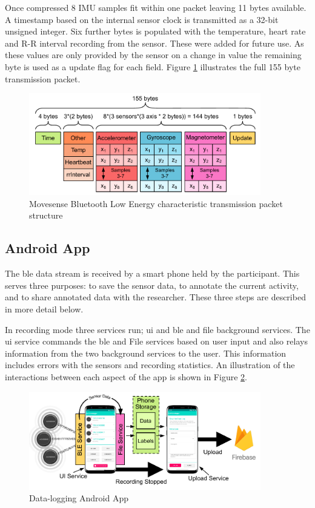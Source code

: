 Once compressed 8 IMU samples fit within one packet leaving 11 bytes available. A timestamp based on the internal sensor clock is transmitted as a 32-bit unsigned integer. Six further bytes is populated with the temperature, heart rate and R-R interval recording from the sensor. These were added for future use. As these values are only provided by the sensor on a change in value the remaining byte is used as a update flag for each field. Figure \ref{fig:methods-ble-packet-structure} illustrates the full 155 byte transmission packet.

\begin{figure}[!hbt]
    \centering
    \includegraphics[width=0.9\textwidth]{content/3-Methods/BLE_Bytes_Packets.pdf}
    \caption[Movesense data packet structure]{Movesense Bluetooth Low Energy characteristic transmission packet structure}
    \label{fig:methods-ble-packet-structure}
\end{figure}

\subsection{Android App}
The \acrshort{ble} data stream is received by a smart phone held by the participant. This serves three purposes: to save the sensor data, to annotate the current activity, and to share annotated data with the researcher. These three steps are described in more detail below. 

In recording mode three services run; \acrfull{ui} and \acrshort{ble} and file background services. The \acrshort{ui} service commands the \acrshort{ble} and File services based on user input and also relays information from the two background services to the user. This information includes errors with the sensors and recording statistics. An illustration of the interactions between each aspect of the app is shown in Figure \ref{fig:methods-android-app}.

\begin{figure}[!hbt]
    \centering
    \includegraphics[width=0.9\textwidth]{content/3-Methods/Android_App.pdf}
    \caption{Data-logging Android App}
    \label{fig:methods-android-app}
\end{figure}

